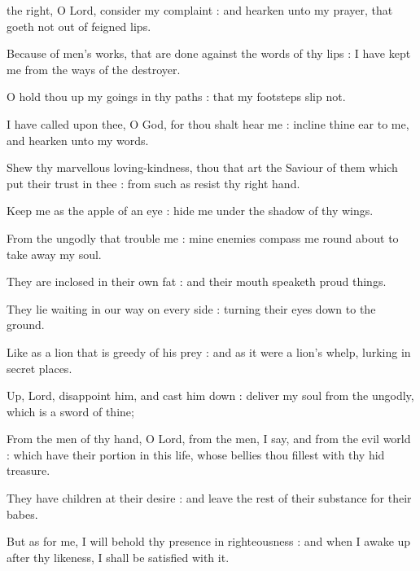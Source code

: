 
 the right, O Lord, consider my complaint : and hearken unto my prayer, that goeth not out of feigned lips.\par
{}
Because of men's works, that are done against the words of thy lips : I have kept me from the ways of the destroyer.\par
{}O hold thou up my goings in thy paths : that my footsteps slip not.\par
{}I have called upon thee, O God, for thou shalt hear me : incline thine ear to me, and hearken unto my words.\par
{}Shew thy marvellous loving-kindness, thou that art the Saviour of them which put their trust in thee : from such as resist thy right hand.\par
{}Keep me as the apple of an eye : hide me under the shadow of thy wings.\par
{}From the ungodly that trouble me : mine enemies compass me round about to take away my soul.\par
{}They are inclosed in their own fat : and their mouth speaketh proud things.\par
{}They lie waiting in our way on every side : turning their eyes down to the ground.\par
{}Like as a lion that is greedy of his prey : and as it were a lion's whelp, lurking in secret places.\par
{}Up, Lord, disappoint him, and cast him down : deliver my soul from the ungodly, which is a sword of thine;\par
{}From the men of thy hand, O Lord, from the men, I say, and from the evil world : which have their portion in this life, whose bellies thou fillest with thy hid treasure.\par
{}They have children at their desire : and leave the rest of their substance for their babes.\par
{}But as for me, I will behold thy presence in righteousness : and when I awake up after thy likeness, I shall be satisfied with it.\par

